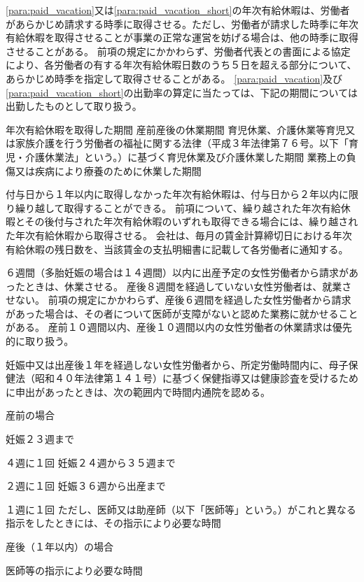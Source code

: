 \documentclass[10pt,a4paper]{jsarticle}
\begin{document}
\label{para:paid_vacation_short}
\term
\ref{para:paid_vacation}又は\ref{para:paid_vacation_short}の年次有給休暇は、労働者があらかじめ請求する時季に取得させる。ただし、労働者が請求した時季に年次有給休暇を取得させることが事業の正常な運営を妨げる場合は、他の時季に取得させることがある。
\term
前項の規定にかかわらず、労働者代表との書面による協定により、各労働者の有する年次有給休暇日数のうち５日を超える部分について、あらかじめ時季を指定して取得させることがある。
\term
\ref{para:paid_vacation}及び\ref{para:paid_vacation_short}の出勤率の算定に当たっては、下記の期間については出勤したものとして取り扱う。
\begin{enumerate}
    \itm 年次有給休暇を取得した期間
    \itm 産前産後の休業期間
    \itm 育児休業、介護休業等育児又は家族介護を行う労働者の福祉に関する法律（平成３年法律第７６号。以下「育児・介護休業法」という。）に基づく育児休業及び介護休業した期間
    \itm 業務上の負傷又は疾病により療養のために休業した期間
\end{enumerate}
\term
付与日から１年以内に取得しなかった年次有給休暇は、付与日から２年以内に限り繰り越して取得することができる。
\term
前項について、繰り越された年次有給休暇とその後付与された年次有給休暇のいずれも取得できる場合には、繰り越された年次有給休暇から取得させる。
\term
会社は、毎月の賃金計算締切日における年次有給休暇の残日数を、当該賃金の支払明細書に記載して各労働者に通知する。

６週間（多胎妊娠の場合は１４週間）以内に出産予定の女性労働者から請求があったときは、休業させる。
\term
産後８週間を経過していない女性労働者は、就業させない。
\term
前項の規定にかかわらず、産後６週間を経過した女性労働者から請求があった場合は、その者について医師が支障がないと認めた業務に就かせることがある。
\term
産前１０週間以内、産後１０週間以内の女性労働者の休業請求は優先的に取り扱う。
 

妊娠中又は出産後１年を経過しない女性労働者から、所定労働時間内に、母子保健法（昭和４０年法律第１４１号）に基づく保健指導又は健康診査を受けるために申出があったときは、次の範囲内で時間内通院を認める。
\begin{enumerate}
    \itm 産前の場合
    \begin{enumerate}
        \itm 妊娠２３週まで\par ４週に１回
        \itm 妊娠２４週から３５週まで\par ２週に１回
        \itm 妊娠３６週から出産まで\par １週に１回
        \itm ただし、医師又は助産師（以下「医師等」という。）がこれと異なる指示をしたときには、その指示により必要な時間
    \end{enumerate}
    \itm 産後（１年以内）の場合
    \begin{enumerate}
        \itm 医師等の指示により必要な時間
    \end{enumerate}
\end{enumerate}
\end{document}
